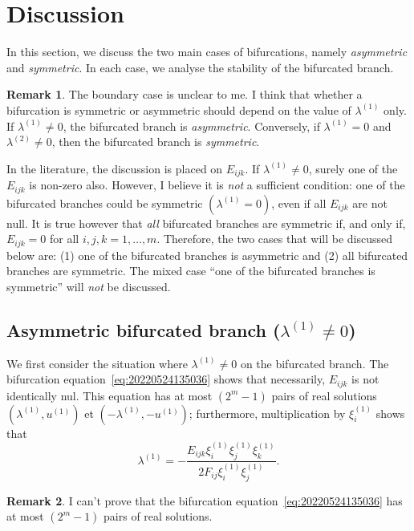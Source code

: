 \documentclass[12pt, final]{scrartcl}
\theoremstyle{definition}
\newtheorem{remark}{Remark}
\newcommand{\order}[2][1]{#2^{(#1)}}
\begin{document}
\section{Discussion}

In this section, we discuss the two main cases of bifurcations, namely
\emph{asymmetric} and \emph{symmetric}. In each case, we analyse the stability
of the bifurcated branch.

\begin{remark}
  The boundary case is unclear to me. I think that whether a bifurcation is
  symmetric or asymmetric should depend on the value of $\order[1]λ$ only. If
  $\order[1]λ ≠ 0$, the bifurcated branch is \emph{asymmetric}. Conversely, if
  $\order[1]λ = 0$ and $\order[2]λ ≠ 0$, then the bifurcated branch is \emph{symmetric}.

  In the literature, the discussion is placed on $E_{ijk}$. If $\order[1]λ ≠ 0$,
  surely one of the $E_{ijk}$ is non-zero also. However, I believe it is
  \emph{not} a sufficient condition: one of the bifurcated branches could be
  symmetric $(\order[1]λ = 0)$, even if all $E_{ijk}$ are not null. It is true
  however that \emph{all} bifurcated branches are symmetric if, and only if,
  $E_{ijk}=0$ for all $i, j, k = 1, \ldots, m$. Therefore, the two cases
  that will be discussed below are: (1) one of the bifurcated branches is
  asymmetric and (2) all bifurcated branches are symmetric. The mixed case ``one
  of the bifurcated branches is symmetric'' will \emph{not} be discussed.
\end{remark}

\subsection{Asymmetric bifurcated branch ($\order[1]λ ≠ 0$)}

We first consider the situation where $\order[1]λ ≠ 0$ on the bifurcated
branch. The bifurcation equation~\eqref{eq:20220524135036} shows that
necessarily, $E_{ijk}$ is not identically nul. This equation has at most
$(2^m - 1)$ pairs of real solutions $(\order[1]λ, \order[1]u)$ et
$(- \order[1]λ, - \order[1]u)$; furthermore, multiplication by
$\order[1]{ξ_i}$ shows that
\begin{equation}
  \label{eq:20220801085236}
  \order[1]λ = -\frac{E_{ijk} \order[1]{ξ_i} \order[1]{ξ_j} \order[1]{ξ_k}}{2 F_{ij} \order[1]{ξ_i} \order[1]{ξ_j}}.
\end{equation}

\begin{remark}
  I can't prove that the bifurcation equation~\eqref{eq:20220524135036} has at
  most $(2^m - 1)$ pairs of real solutions.
\end{remark}
\end{document}
